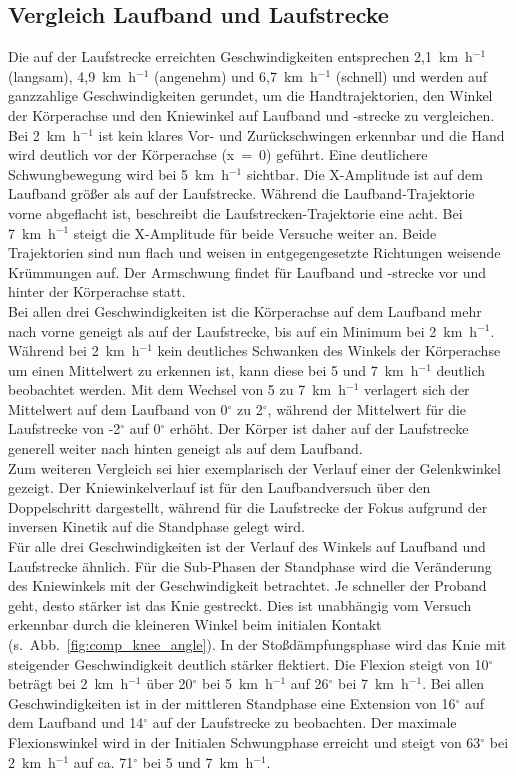 \subsection{Vergleich Laufband und Laufstrecke}
Die auf der Laufstrecke erreichten Geschwindigkeiten entsprechen 2,1~km~h$^{-1}$ (langsam), 4,9~km~h$^{-1}$ (angenehm) und 6,7~km~h$^{-1}$ (schnell) und werden auf ganzzahlige Geschwindigkeiten gerundet, um die Handtrajektorien, den Winkel der Körperachse und den Kniewinkel auf Laufband und -strecke zu vergleichen.\\
Bei 2~km~h$^{-1}$ ist kein klares Vor- und Zurückschwingen erkennbar und die Hand wird deutlich vor der Körperachse (x~=~0) geführt. Eine deutlichere Schwungbewegung wird bei 5~km~h$^{-1}$ sichtbar. Die X-Amplitude ist auf dem Laufband größer als auf der Laufstrecke. Während die Laufband-Trajektorie vorne abgeflacht ist, beschreibt die Laufstrecken-Trajektorie eine acht. Bei 7~km~h$^{-1}$ steigt die X-Amplitude für beide Versuche weiter an. Beide Trajektorien sind nun flach und weisen in entgegengesetzte Richtungen weisende Krümmungen auf. Der Armschwung findet für Laufband und -strecke vor und hinter der Körperachse statt.\\
Bei allen drei Geschwindigkeiten ist die Körperachse auf dem Laufband mehr nach vorne geneigt als auf der Laufstrecke, bis auf ein Minimum bei 2~km~h$^{-1}$. Während bei 2~km~h$^{-1}$ kein deutliches Schwanken des Winkels der Körperachse um einen Mittelwert zu erkennen ist, kann diese bei 5 und 7~km~h$^{-1}$ deutlich beobachtet werden. Mit dem Wechsel von 5 zu 7~km~h$^{-1}$ verlagert sich der Mittelwert auf dem Laufband von 0$^{\circ}$ zu 2$^{\circ}$, während der Mittelwert für die Laufstrecke von -2$^{\circ}$ auf 0$^{\circ}$ erhöht. Der Körper ist daher auf der Laufstrecke generell weiter nach hinten geneigt als auf dem Laufband.\\
Zum weiteren Vergleich sei hier exemplarisch der Verlauf einer der Gelenkwinkel gezeigt. Der Kniewinkelverlauf ist für den Laufbandversuch über den Doppelschritt dargestellt, während für die Laufstrecke der Fokus aufgrund der inversen Kinetik auf die Standphase gelegt wird.\\
Für alle drei Geschwindigkeiten ist der Verlauf des Winkels auf Laufband und Laufstrecke ähnlich. Für die Sub-Phasen der Standphase wird die Veränderung des Kniewinkels mit der Geschwindigkeit betrachtet. Je schneller der Proband geht, desto stärker ist das Knie gestreckt. Dies ist unabhängig vom Versuch erkennbar durch die kleineren Winkel beim initialen Kontakt (s.~Abb.~\ref{fig:comp_knee_angle}). In der Stoßdämpfungsphase wird das Knie mit steigender Geschwindigkeit deutlich stärker flektiert. Die Flexion steigt von 10$^{\circ}$ beträgt bei 2~km~h$^{-1}$ über 20$^{\circ}$ bei 5~km~h$^{-1}$ auf 26$^{\circ}$ bei 7~km~h$^{-1}$. Bei allen Geschwindigkeiten ist in der mittleren Standphase eine Extension von 16$^{\circ}$ auf dem Laufband und 14$^{\circ}$ auf der Laufstrecke zu beobachten. Der maximale Flexionswinkel wird in der Initialen Schwungphase erreicht und steigt von 63$^{\circ}$ bei 2~km~h$^{-1}$ auf ca. 71$^{\circ}$ bei 5 und 7~km~h$^{-1}$.\\ 

